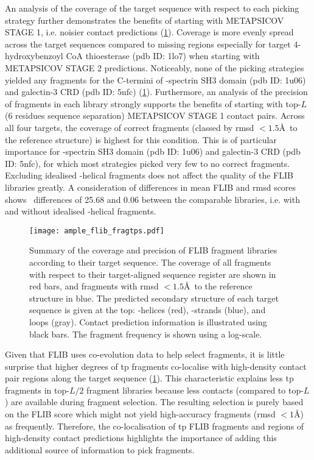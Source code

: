 An analysis of the coverage of the target sequence with respect to each picking strategy further demonstrates the benefits of starting with METAPSICOV STAGE 1, i.e. noisier contact predictions (\cref{fig:ample_flib_fragtps}). Coverage is more evenly spread across the target sequences compared to missing regions especially for target 4-hydroxybenzoyl CoA thioesterase (\gls{pdb} ID: 1lo7) when starting with METAPSICOV STAGE 2 predictions. Noticeably, none of the picking strategies yielded any fragments for the C-termini of \textalpha-spectrin SH3 domain (\gls{pdb} ID: 1u06) and galectin-3 CRD (\gls{pdb} ID: 5nfc) (\cref{fig:ample_flib_fragtps}). Furthermore, an analysis of the precision of fragments in each library strongly supports the benefits of starting with top-$L$ (6 residues sequence separation) METAPSICOV STAGE 1 contact pairs. Across all four targets, the coverage of correct fragments (classed by \gls{rmsd} $<1.5$\AA\ to the reference structure) is highest for this condition. This is of particular importance for \textalpha-spectrin SH3 domain (\gls{pdb} ID: 1u06) and galectin-3 CRD (\gls{pdb} ID: 5nfc), for which most strategies picked very few to no correct fragments. Excluding idealised \textalpha-helical fragments does not affect the quality of the FLIB libraries greatly. A consideration of differences in mean FLIB and \gls{rmsd} scores shows \textDelta\ differences of 25.68 and 0.06 between the comparable libraries, i.e. with and without idealised \textalpha-helical fragments.

\begin{figure}[H]
	\centering
	\texttt{[image: ample\_flib\_fragtps.pdf]}
	\caption[Coverage and precision of Flib fragment libraries]{Summary of the coverage and precision of FLIB fragment libraries according to their target sequence. The coverage of all fragments with respect to their target-aligned sequence register are shown in red bars, and fragments with \gls{rmsd} $<1.5$\AA\ to the reference structure in blue. The predicted secondary structure of each target sequence is given at the top: \textalpha-helices (red), \textbeta-strands (blue), and loops (gray). Contact prediction information is illustrated using black bars. The fragment frequency is shown using a log-scale.}
	\label{fig:ample_flib_fragtps}
\end{figure}

Given that FLIB uses co-evolution data to help select fragments, it is little surprise that higher degrees of \gls{tp} fragments co-localise with high-density contact pair regions along the target sequence (\cref{fig:ample_flib_fragtps}). This characteristic explains less \gls{tp} fragments in top-$L/2$ fragment libraries because less contacts (compared to top-$L$) are available during fragment selection. The resulting selection is purely based on the FLIB score which might not yield high-accuracy fragments (\gls{rmsd} $<1$\AA) as frequently. Therefore, the co-localisation of \gls{tp} FLIB fragments and regions of high-density contact predictions highlights the importance of adding this additional source of information to pick fragments. 

